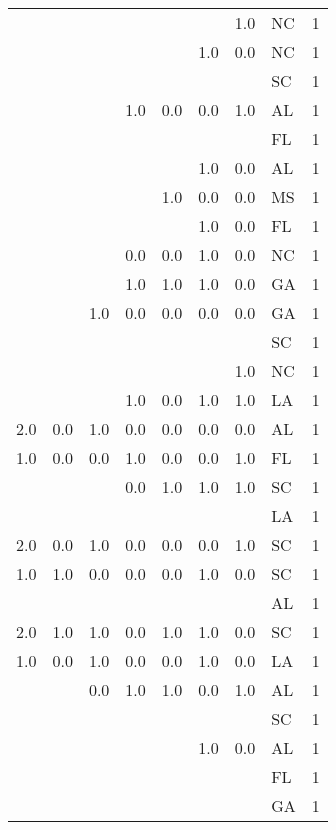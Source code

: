 \begin{tabular}{llllllllr}
    &     &     &     &     &     & 1.0 & NC &     1 \\
    &     &     &     &     & 1.0 & 0.0 & NC &     1 \\
    &     &     &     &     &     &     & SC &     1 \\
    &     &     & 1.0 & 0.0 & 0.0 & 1.0 & AL &     1 \\
    &     &     &     &     &     &     & FL &     1 \\
    &     &     &     &     & 1.0 & 0.0 & AL &     1 \\
    &     &     &     & 1.0 & 0.0 & 0.0 & MS &     1 \\
    &     &     &     &     & 1.0 & 0.0 & FL &     1 \\
    &     &     & 0.0 & 0.0 & 1.0 & 0.0 & NC &     1 \\
    &     &     & 1.0 & 1.0 & 1.0 & 0.0 & GA &     1 \\
    &     & 1.0 & 0.0 & 0.0 & 0.0 & 0.0 & GA &     1 \\
    &     &     &     &     &     &     & SC &     1 \\
    &     &     &     &     &     & 1.0 & NC &     1 \\
    &     &     & 1.0 & 0.0 & 1.0 & 1.0 & LA &     1 \\
2.0 & 0.0 & 1.0 & 0.0 & 0.0 & 0.0 & 0.0 & AL &     1 \\
1.0 & 0.0 & 0.0 & 1.0 & 0.0 & 0.0 & 1.0 & FL &     1 \\
    &     &     & 0.0 & 1.0 & 1.0 & 1.0 & SC &     1 \\
    &     &     &     &     &     &     & LA &     1 \\
2.0 & 0.0 & 1.0 & 0.0 & 0.0 & 0.0 & 1.0 & SC &     1 \\
1.0 & 1.0 & 0.0 & 0.0 & 0.0 & 1.0 & 0.0 & SC &     1 \\
    &     &     &     &     &     &     & AL &     1 \\
2.0 & 1.0 & 1.0 & 0.0 & 1.0 & 1.0 & 0.0 & SC &     1 \\
1.0 & 0.0 & 1.0 & 0.0 & 0.0 & 1.0 & 0.0 & LA &     1 \\
    &     & 0.0 & 1.0 & 1.0 & 0.0 & 1.0 & AL &     1 \\
    &     &     &     &     &     &     & SC &     1 \\
    &     &     &     &     & 1.0 & 0.0 & AL &     1 \\
    &     &     &     &     &     &     & FL &     1 \\
    &     &     &     &     &     &     & GA &     1 \\

\end{tabular}
